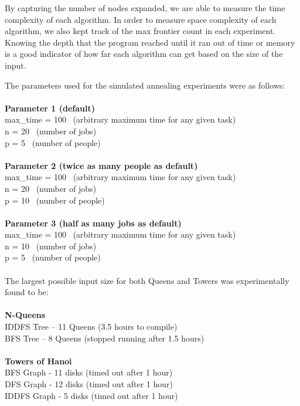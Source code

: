 \documentclass[11pt]{article}
\begin{document}
By capturing the number of nodes expanded, we are able to measure the time complexity of each algorithm. In order to measure space complexity of each algorithm, we also kept track of the max frontier count in each experiment. Knowing the depth that the program reached until it ran out of time or memory is a good indicator of how far each algorithm can get based on the size of the input.

The parameters used for the simulated annealing experiments were as follows:\\~\\
\textbf{Parameter 1 (default)}\\
max\_time = 100 \ (arbitrary maximum time for any given task)\\
n = 20 \ (number of jobs)\\
p = 5 \ (number of people)\\~\\
\textbf{Parameter 2 (twice as many people as default)}\\
max\_time = 100 \ (arbitrary maximum time for any given task)\\
n = 20 \ (number of jobs)\\
p = 10 \ (number of people)\\~\\
\textbf{Parameter 3 (half as many jobs as default)}\\
max\_time = 100 \ (arbitrary maximum time for any given task)\\
n = 10 \ (number of jobs)\\
p = 5 \ (number of people)\\~\\

\pagebreak
The largest possible input size for both Queens and Towers was experimentally found to be:\\~\\
\textbf{N-Queens}\\
IDDFS Tree – 11 Queens (3.5 hours to compile)\\
BFS Tree – 8 Queens (stopped running after 1.5 hours)\\~\\
\textbf{Towers of Hanoi}\\
BFS Graph - 11 disks (timed out after 1 hour)\\
DFS Graph - 12 disks (timed out after 1 hour)\\
IDDFS Graph - 5 disks (timed out after 1 hour)
\end{document}

